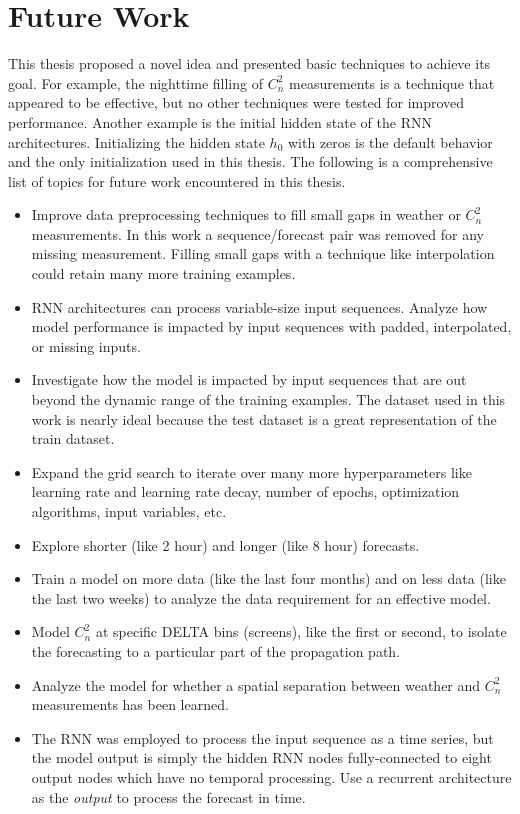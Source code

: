 \section{Future Work}
This thesis proposed a novel idea and presented basic techniques to achieve its goal. For example, the nighttime filling of $C_{n}^{2}$ measurements is a technique that appeared to be effective, but no other techniques were tested for improved performance. Another example is the initial hidden state of the \ac{RNN} architectures. Initializing the hidden state $h_{0}$ with zeros is the default behavior and the only initialization used in this thesis. The following is a comprehensive list of topics for future work encountered in this thesis.
\begin{itemize}
	\item Improve data preprocessing techniques to fill small gaps in weather or $C_{n}^{2}$ measurements. In this work a sequence/forecast pair was removed for any missing measurement. Filling small gaps with a technique like interpolation could retain many more training examples.
	\item \ac{RNN} architectures can process variable-size input sequences. Analyze how model performance is impacted by input sequences with padded, interpolated, or missing inputs.
	\item Investigate how the model is impacted by input sequences that are out beyond the dynamic range of the training examples. The dataset used in this work is nearly ideal because the test dataset is a great representation of the train dataset.
	\item Expand the grid search to iterate over many more hyperparameters like learning rate and learning rate decay, number of epochs, optimization algorithms, input variables, etc.
	\item Explore shorter (like 2 hour) and longer (like 8 hour) forecasts.
	\item Train a model on more data (like the last four months) and on less data (like the last two weeks) to analyze the data requirement for an effective model.
	\item Model $C_{n}^{2}$ at specific DELTA bins (screens), like the first or second, to isolate the forecasting to a particular part of the propagation path.
	\item Analyze the model for whether a spatial separation between weather and $C_{n}^{2}$ measurements has been learned.
	\item The \ac{RNN} was employed to process the input sequence as a time series, but the model output is simply the hidden \ac{RNN} nodes fully-connected to eight output nodes which have no temporal processing. Use a recurrent architecture as the \emph{output} to process the forecast in time.
\end{itemize}